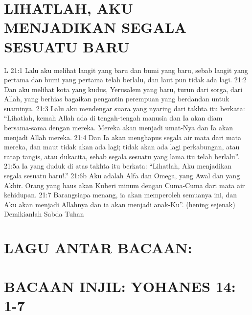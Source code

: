 \section*{LIHATLAH, AKU MENJADIKAN SEGALA SESUATU BARU}

L 21:1 Lalu aku melihat langit yang baru dan bumi yang baru,
sebab langit yang pertama dan bumi yang pertama telah berlalu, dan
laut pun tidak ada lagi. 21:2 Dan aku melihat kota yang kudus,
Yerusalem yang baru, turun dari sorga, dari Allah, yang berhias
bagaikan pengantin perempuan yang berdandan untuk suaminya.
21:3 Lalu aku mendengar suara yang nyaring dari takhta itu berkata:
“Lihatlah, kemah Allah ada di tengah-tengah manusia dan Ia akan
diam bersama-sama dengan mereka. Mereka akan menjadi umat-Nya
dan Ia akan menjadi Allah mereka. 21:4 Dan Ia akan menghapus
segala air mata dari mata mereka, dan maut tidak akan ada lagi; tidak
akan ada lagi perkabungan, atau ratap tangis, atau dukacita, sebab
segala sesuatu yang lama itu telah berlalu”. 21:5a Ia yang duduk di
atas takhta itu berkata: “Lihatlah, Aku menjadikan segala sesuatu
baru!.” 21:6b Aku adalah Alfa dan Omega, yang Awal dan yang
Akhir. Orang yang haus akan Kuberi minum dengan Cuma-Cuma
dari mata air kehidupan. 21:7 Barangsiapa menang, ia akan
memperoleh semuanya ini, dan Aku akan menjadi Allahnya dan ia
akan menjadi anak-Ku”. (hening sejenak)
Demikianlah Sabda Tuhan


\section*{LAGU ANTAR BACAAN:}

\section*{BACAAN INJIL: YOHANES 14: 1-7}





